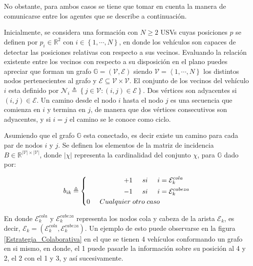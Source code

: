 No obstante, para ambos casos se tiene que tomar en cuenta la manera de comunicarse entre los agentes que se describe a continuación. 

Inicialmente, se considera una formación con $N\geq{2}$ USVs cuyas posiciones $p$ se definen por $p_i\in\mathbb{R}^2$ con $i\in\left\lbrace{1,\cdots,N}\right\rbrace$, en donde los vehículos son capaces de detectar las posiciones relativas con respecto a sus vecinos. Evaluando la relación existente entre los vecinos con respecto a su disposición en el plano puedes apreciar que forman un grafo $\mathbb{G}=\left(\mathcal{V},\mathcal{E}\right)$ siendo $\mathcal{V}=\left\langle{1,\cdots,N}\right\rbrace$ los distintos nodos pertenecientes al grafo y  $\mathcal{E}\subseteq\mathcal{V}\times\mathcal{V}$. El conjunto de los vecinos del vehículo $i$ esta definido por $\mathcal{N}_i\triangleq\left\lbrace{j\in\mathcal{V}:\left(i,j\right)\in\mathcal{E}}\right\rbrace$. Dos vértices son adyacentes si $\left(i,j\right)\in\mathcal{E}$. Un camino desde el nodo $i$ hasta el nodo $j$ es una secuencia que comienza en $i$ y termina en $j$, de manera que dos vértices consecutivos son adyacentes, y si $i=j$ el camino se le conoce como ciclo. \cite{Control_Formacion}

Asumiendo que el grafo $\mathbb{G}$ esta conectado, es decir existe un camino para cada par de nodos $i$ y $j$. Se definen los elementos de la matriz de incidencia $B\in\mathbb{R}^{|\mathcal{V}|\times|\mathcal{V}|}$, donde $|\chi|$ representa la cardinalidad del conjunto $\chi$, para $\mathbb{G}$ dado por:

\begin{equation} \label{Incidence}
  b_{ik}\triangleq\left \{
    \begin{aligned}
+1\hspace{5mm}si\hspace{5mm}i&=\mathcal{E}^{cola}_{k}\\
-1\hspace{5mm}si\hspace{5mm}i&=\mathcal{E}^{cabeza}_{k}\\
0\hspace{5mm}Cualquier\hspace{1mm}otro\hspace{1mm}caso
    \end{aligned}
  \right .
\end{equation}

En donde $\mathcal{E}^{cola}_{k}$ y $\mathcal{E}^{cabeza}_{k}$ representa los nodos cola y cabeza de la arista $\mathcal{E}_{k}$, es decir, $\mathcal{E}_{k}=\left(\mathcal{E}^{cola}_{k},\mathcal{E}^{cabeza}_{k}\right)$. Un ejemplo de esto puede observarse en la figura \ref{Estrategia_Colaborativa} en el que se tienen 4 vehículos conformando un grafo en si mismo, en donde, el 1 puede pasarle la información sobre su posición al 4 y 2, el 2 con el 1 y 3, y así sucesivamente.

